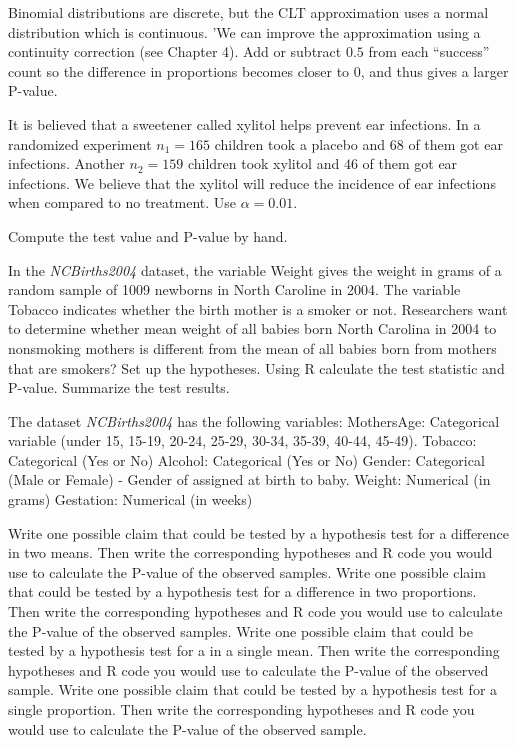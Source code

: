 \clearpage

 \bbox   
  \bi
  \ii Binomial distributions are discrete, but the CLT approximation uses a normal distribution which is continuous.
  '\ii We can improve the approximation using a \alert{continuity correction} (see Chapter 4).
  \ii Add or subtract $0.5$ from each ``success'' count so the \alert{difference in proportions becomes closer to 0}, and thus gives a larger P-value.
  \ei
\ebox

\bb[resume]
\ii It is believed that a sweetener called xylitol helps prevent ear infections. In a randomized experiment $n_1 = 165$ children took a placebo and $68$ of them got ear infections. Another $n_2 = 159$ children took xylitol and $46$ of them got ear infections. We believe that the xylitol will reduce the incidence of ear infections when compared to no treatment. Use $\alpha=0 .01$. \bigskip

Compute the test value and P-value by hand.
\ee

\clearpage


\bb[resume]
\ii In the \textit{NCBirths2004} dataset, the variable Weight gives the weight in grams of a random sample of 1009 newborns in North Caroline in 2004. The variable Tobacco indicates whether the birth mother is a smoker or not. Researchers want to determine whether mean weight of all babies born North Carolina in 2004 to nonsmoking mothers is different from the mean of all babies born from mothers that are smokers?
\bb
\ii Set up the hypotheses.  \vspace{1in}
\ii Using R calculate the test statistic and P-value. \vspace{1.5in}
\ii Summarize the test results.  \vspace{1.5in}
\ee


\clearpage
{}

\ii The dataset \textit{NCBirths2004} has the following variables:
\bi
\ii MothersAge: Categorical variable (under 15, 15-19, 20-24, 25-29, 30-34, 35-39, 40-44, 45-49).
\ii Tobacco: Categorical (Yes or No)
\ii Alcohol: Categorical (Yes or No)
\ii Gender: Categorical (Male or Female) - Gender of assigned at birth to baby.
\ii Weight: Numerical (in grams)
\ii Gestation: Numerical (in weeks)
\ei

\bb
\ii Write one possible claim that could be tested by a hypothesis test for a difference in two means. Then write the corresponding hypotheses and R code you would use to calculate the P-value of the observed samples. \vfill
\ii Write one possible claim that could be tested by a hypothesis test for a difference in two proportions. Then write the corresponding hypotheses and R code you would use to calculate the P-value of the observed samples. \vfill
\ii Write one possible claim that could be tested by a hypothesis test for a in a single mean. Then write the corresponding hypotheses and R code you would use to calculate the P-value of the observed sample. \vfill
\ii Write one possible claim that could be tested by a hypothesis test for a single proportion. Then write the corresponding hypotheses and R code you would use to calculate the P-value of the observed sample. \vfill
\ee
\ee

